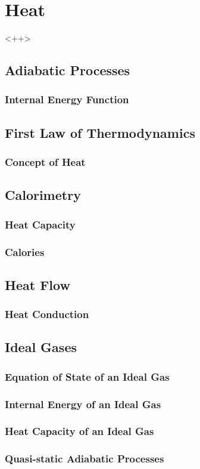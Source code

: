 \documentclass[../qm.tex]{subfiles}
\begin{document}
\chapter{Heat}
<++>
\section{Adiabatic Processes}
\subsection{Internal Energy Function}
\section{First Law of Thermodynamics}
\subsection{Concept of Heat}
\section{Calorimetry}
\subsection{Heat Capacity}
\subsection{Calories}
\section{Heat Flow}
\subsection{Heat Conduction}
\section{Ideal Gases}
\subsection{Equation of State of an Ideal Gas}
\subsection{Internal Energy of an Ideal Gas}
\subsection{Heat Capacity of an Ideal Gas}
\subsection{Quasi-static Adiabatic Processes}
\end{document}
